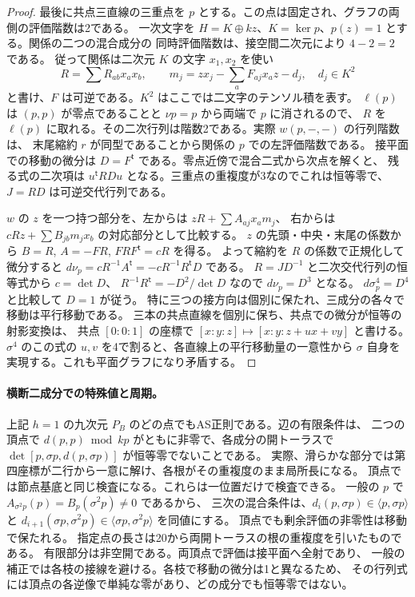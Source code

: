\begin{proof}
最後に共点三直線の三重点を $p$ とする。この点は固定され、グラフの両側の評価階数は2である。
一次文字を $H=K\oplus kz$、$K=\ker p$、$p(z)=1$ とする。関係の二つの混合成分の
同時評価階数は、接空間二次元により $4-2=2$ である。
従って関係は二次元 $K$ の文字 $x_1,x_2$ を使い
\[
 R=\sum R_{ab}x_ax_b,\qquad m_j=zx_j-\sum_a F_{aj}x_a z-d_j,\quad d_j\in K^2
\]
と書け、$F$ は可逆である。$K^2$ はここでは二文字のテンソル積を表す。
$\ell(p)$ は $(p,p)$ が零点であることと $\nu p=p$ から両端で $p$ に消されるので、
$R$ を $\ell(p)$ に取れる。その二次行列は階数2である。実際 $w(p,-,-)$ の行列階数は、
末尾縮約 $r$ が同型であることから関係の $p$ での左評価階数である。
接平面での移動の微分は $D=F^{\mathsf t}$ である。零点近傍で混合二式から次点を解くと、
残る式の二次項は $u^{\mathsf t}R D u$ となる。三重点の重複度が3なのでこれは恒等零で、
$J=R D$ は可逆交代行列である。

$w$ の $z$ を一つ持つ部分を、左からは $zR+\sum A_{aj}x_a m_j$、
右からは $cRz+\sum B_{jb}m_j x_b$ の対応部分として比較する。
$z$ の先頭・中央・末尾の係数から $B=R$, $A=-FR$, $FRF^{\mathsf t}=cR$ を得る。
よって縮約を $R$ の係数で正規化して微分すると
$d\nu_p=cR^{-1}A^{\mathsf t}=-cR^{-1}R^{\mathsf t}D$ である。
$R=JD^{-1}$ と二次交代行列の恒等式から $c=\det D$、
$R^{-1}R^{\mathsf t}=-D^2/\det D$ なので $d\nu_p=D^3$ となる。
$d\sigma^4_p=D^4$ と比較して $D=1$ が従う。
特に三つの接方向は個別に保たれ、三成分の各々で移動は平行移動である。
三本の共点直線を個別に保ち、共点での微分が恒等の射影変換は、
共点 $[0:0:1]$ の座標で $[x:y:z]\mapsto[x:y:z+u x+v y]$ と書ける。
$\sigma^4$ のこの式の $u,v$ を4で割ると、各直線上の平行移動量の一意性から
$\sigma$ 自身を実現する。これも平面グラフになり矛盾する。
\end{proof}

\paragraph{横断二成分での特殊値と周期。}
上記 $h=1$ の九次元 $P_B$ のどの点でもAS正則である。辺の有限条件は、
二つの頂点で $d(p,p)\bmod kp$ がともに非零で、各成分の開トーラスで
$\det[p,\sigma p,d(p,\sigma p)]$ が恒等零でないことである。
実際、滑らかな部分では第四座標が二行から一意に解け、各根がその重複度のまま局所長になる。
頂点では節点基底と同じ検査になる。これらは一位置だけで検査できる。
一般の $p$ で $A_{\sigma^2p}(p)=B_p(\sigma^2p)\ne0$ であるから、
三次の混合条件は、$d_i(p,\sigma p)\in\langle p,\sigma p\rangle$ と
$d_{i+1}(\sigma p,\sigma^2p)\in\langle\sigma p,\sigma^2p\rangle$ を同値にする。
頂点でも剰余評価の非零性は移動で保たれる。
指定点の長さは20から両開トーラスの根の重複度を引いたものである。
有限部分は非空開である。両頂点で評価は接平面へ全射であり、
一般の補正では各枝の接線を避ける。各枝で移動の微分は1と異なるため、
その行列式には頂点の各逆像で単純な零があり、どの成分でも恒等零ではない。


